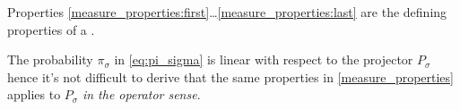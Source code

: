 \begin{remark}
  Properties \ref{measure_properties:first}\dots\ref{measure_properties:last}
  are the defining properties of a  \cite{EncMath_Measure}.
\end{remark}

The probability $\pi_{\sigma}$ in \eqref{eq:pi_sigma} is linear with respect to the projector $P_{\sigma}$ hence it's not difficult to derive that the same properties in \autoref{measure_properties} applies to $P_{\sigma}$ \emph{in the operator sense}.